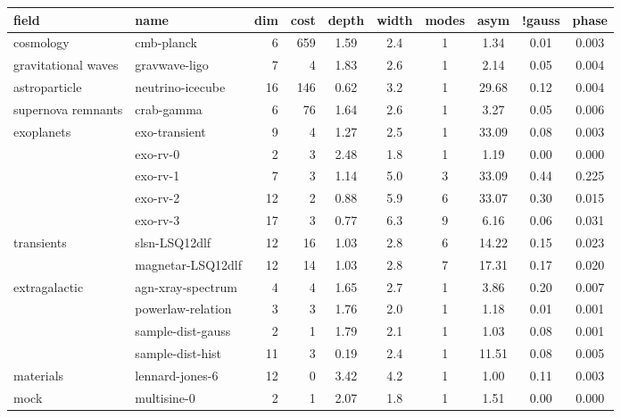 
\begin{tabular}{ll|rrcccccc}
field                & name                 & dim & cost & depth & width & modes & asym & !gauss & phase \\
\hline
\hline
cosmology            & cmb-planck           & 6   & 659  & 1.59 & 2.4 &    1 & 1.34 & 0.01 & 0.003 \\
gravitational waves  & gravwave-ligo        & 7   & 4    & 1.83 & 2.6 &    1 & 2.14 & 0.05 & 0.004 \\
astroparticle        & neutrino-icecube     & 16  & 146  & 0.62 & 3.2 &    1 & 29.68 & 0.12 & 0.004 \\
supernova remnants   & crab-gamma           & 6   & 76   & 1.64 & 2.6 &    1 & 3.27 & 0.05 & 0.006 \\
exoplanets           & exo-transient        & 9   & 4    & 1.27 & 2.5 &    1 & 33.09 & 0.08 & 0.003 \\
                     & exo-rv-0             & 2   & 3    & 2.48 & 1.8 &    1 & 1.19 & 0.00 & 0.000 \\
                     & exo-rv-1             & 7   & 3    & 1.14 & 5.0 &    3 & 33.09 & 0.44 & 0.225 \\
                     & exo-rv-2             & 12  & 2    & 0.88 & 5.9 &    6 & 33.07 & 0.30 & 0.015 \\
                     & exo-rv-3             & 17  & 3    & 0.77 & 6.3 &    9 & 6.16 & 0.06 & 0.031 \\
transients           & slsn-LSQ12dlf        & 12  & 16   & 1.03 & 2.8 &    6 & 14.22 & 0.15 & 0.023 \\
                     & magnetar-LSQ12dlf    & 12  & 14   & 1.03 & 2.8 &    7 & 17.31 & 0.17 & 0.020 \\
extragalactic        & agn-xray-spectrum    & 4   & 4    & 1.65 & 2.7 &    1 & 3.86 & 0.20 & 0.007 \\
                     & powerlaw-relation    & 3   & 3    & 1.76 & 2.0 &    1 & 1.18 & 0.01 & 0.001 \\
                     & sample-dist-gauss    & 2   & 1    & 1.79 & 2.1 &    1 & 1.03 & 0.08 & 0.001 \\
                     & sample-dist-hist     & 11  & 3    & 0.19 & 2.4 &    1 & 11.51 & 0.08 & 0.005 \\
materials            & lennard-jones-6      & 12  & 0    & 3.42 & 4.2 &    1 & 1.00 & 0.11 & 0.003 \\
\hline
mock                 & multisine-0          & 2   & 1    & 2.07 & 1.8 &    1 & 1.51 & 0.00 & 0.000 \\

\end{tabular}

